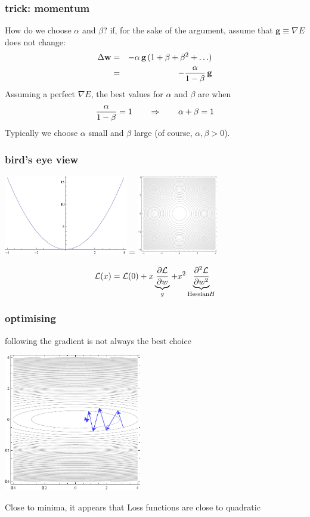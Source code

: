 \documentclass[USenglish,pdftex,compress,10pt,svgnamesi,handout]{beamer}
\def\Vec#1{\textbf{#1}}
\begin{document}
\begin{frame}
\frametitle{trick: momentum}
How do we choose $\alpha$ and $\beta$? 
if, for the sake of the argument, assume that  $\Vec g\equiv\nabla E$ does not change:
\begin{eqnarray*}
\Delta\Vec w &=& - \alpha\,\Vec g \,(1 + \beta + \beta^2 + \ldots) \\
		&=& -{\alpha \over 1-\beta} \,\Vec g
\end{eqnarray*}
\pause
Assuming a perfect $\nabla E$, the best values for $\alpha$ and $\beta$ are when
$$
  {\alpha \over 1-\beta}=1 \qquad \Rightarrow \qquad \alpha+\beta=1
$$
Typically we choose $\alpha$ small and $\beta$ large (of course, $\alpha,\beta>0$).

\end{frame}





\begin{frame}
\frametitle{bird's eye view}
\includegraphics[height=35mm]{pics/xx.pdf} \quad\quad=\quad\quad
\includegraphics[height=35mm]{pics/H1.pdf}

\pause
$$
\mathcal L(x) = \mathcal L(0) + x \underbrace{\partial \mathcal L \over \partial w}_g 
		+ x^2\underbrace{\partial^2 \mathcal L \over \partial w^2}_{\textrm{Hessian} H}
$$
\end{frame}




\begin{frame}
\frametitle{optimising}
following the gradient is not always the best choice

\includegraphics[height=60mm]{pics/H5opt.pdf}

Close to minima, it appears that Loss functions are close to quadratic
\end{frame}
\end{document}
